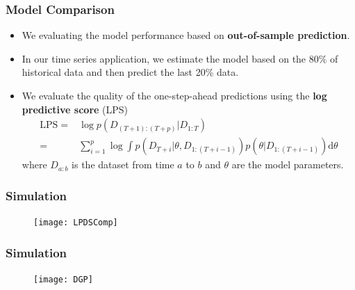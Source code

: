 \documentclass[10pt,aspectratio=169]{beamer}
\begin{document}
\begin{frame}
  \frametitle{Model Comparison}
  \begin{itemize}
  \item We evaluating the model performance based on \textbf{out-of-sample prediction}.
  \item In our time series application, we estimate the model based on the 80\% of
    historical data and then predict the last 20\% data.

  \item We evaluate the quality of the one-step-ahead predictions using the \textbf{log
      predictive score} (LPS)
    \begin{align*}
      \mathrm{LPS}=&\log p(D_{(T+1):(T+p)}|D_{1:T})\\
      =&\sum\nolimits _{i=1}^{p}\log\int p(D_{T+i}|\theta,D_{1:(T+i-1)})p(\theta|D_{1:(T+i-1)})\mathrm{d}\theta
    \end{align*}
    where $D_{a:b}$ is the dataset from time $a$ to $b$ and $\theta$ are the model
    parameters.
  \end{itemize}
\end{frame}


\begin{frame}
  \frametitle{Simulation}

  \begin{figure}[!h]
    \centering
    \texttt{[image: LPDSComp]}
  \end{figure}
\end{frame}

\begin{frame}
  \frametitle{Simulation}

  \begin{figure}[!h]
    \centering
    \texttt{[image: DGP]}
  \end{figure}
\end{frame}
\end{document}
